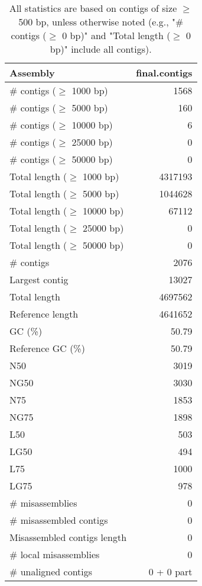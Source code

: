 \documentclass[12pt,a4paper]{article}
\begin{document}
\begin{table}[ht]
\begin{center}
\caption{All statistics are based on contigs of size $\geq$ 500 bp, unless otherwise noted (e.g., "\# contigs ($\geq$ 0 bp)" and "Total length ($\geq$ 0 bp)" include all contigs).}
\begin{tabular}{|l*{1}{|r}|}
\hline
Assembly & final.contigs \\ \hline
\# contigs ($\geq$ 1000 bp) & 1568 \\ \hline
\# contigs ($\geq$ 5000 bp) & 160 \\ \hline
\# contigs ($\geq$ 10000 bp) & 6 \\ \hline
\# contigs ($\geq$ 25000 bp) & 0 \\ \hline
\# contigs ($\geq$ 50000 bp) & 0 \\ \hline
Total length ($\geq$ 1000 bp) & 4317193 \\ \hline
Total length ($\geq$ 5000 bp) & 1044628 \\ \hline
Total length ($\geq$ 10000 bp) & 67112 \\ \hline
Total length ($\geq$ 25000 bp) & 0 \\ \hline
Total length ($\geq$ 50000 bp) & 0 \\ \hline
\# contigs & 2076 \\ \hline
Largest contig & 13027 \\ \hline
Total length & 4697562 \\ \hline
Reference length & 4641652 \\ \hline
GC (\%) & 50.79 \\ \hline
Reference GC (\%) & 50.79 \\ \hline
N50 & 3019 \\ \hline
NG50 & 3030 \\ \hline
N75 & 1853 \\ \hline
NG75 & 1898 \\ \hline
L50 & 503 \\ \hline
LG50 & 494 \\ \hline
L75 & 1000 \\ \hline
LG75 & 978 \\ \hline
\# misassemblies & 0 \\ \hline
\# misassembled contigs & 0 \\ \hline
Misassembled contigs length & 0 \\ \hline
\# local misassemblies & 0 \\ \hline
\# unaligned contigs & 0 + 0 part \\ \hline

\end{tabular}
\end{center}
\end{table}
\end{document}
